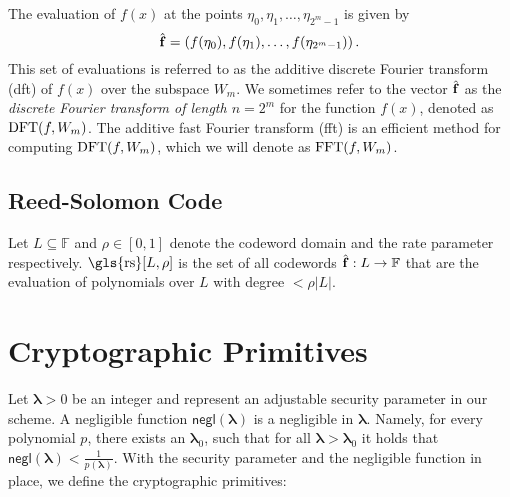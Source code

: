 \begin{definition}
	The evaluation of $f(x)$ at the points $\eta_0, \eta_1, \ldots, \eta_{2^m-1}$ is given by
	\begin{equation*}
		\hat{{\bf{f}}} = \left( f(\eta_0), f(\eta_1), \ldots, f(\eta_{2^m-1}) \right).
	\end{equation*}
	This set of evaluations is referred to as the additive discrete Fourier transform (\gls{dft}) of $f(x)$ over the subspace $W_m$. We sometimes refer to the vector $\hat{{\bf{f}}}$ as the \textit{discrete Fourier transform of length $n=2^m$} for the function $f(x)$, denoted as $\operatorname{DFT}(f, W_m)$. The additive fast Fourier transform (\gls{fft}) is an efficient method for computing $\operatorname{DFT}(f, W_m)$, which we will denote as $\operatorname{FFT}(f, W_m)$.
\end{definition}

\subsection{Reed-Solomon Code}

\begin{definition}\label{RScode} Let $L\subseteq\mathbb{F}$ and $\rho \in [0,1]$ denote the codeword domain and the rate parameter respectively. $\text{\gls{rs}}[L, \rho]$ is the set of all codewords $\hat{{\bf{f}}}:L\rightarrow\mathbb{F}$ 
	that are the evaluation of polynomials over \(L\) with degree \( < \rho|L| \).
\end{definition}

\section{Cryptographic Primitives}
\label{sec:prel_Cryptographic Primitives}

Let $\boldsymbol{\lambda} > 0$ be an integer and represent an adjustable security parameter in our scheme. A negligible function $\mathsf{negl}(\boldsymbol{\lambda})$ is a negligible in $\boldsymbol{\lambda}$. Namely, for every polynomial $p$, there exists an $\boldsymbol{\lambda}_0$, such that for   all $\boldsymbol{\lambda} > \boldsymbol{\lambda}_0$ it holds that $\mathsf{negl}(\boldsymbol{\lambda})<\frac{1}{p(\boldsymbol{\lambda})}$. With the security parameter and the negligible function in place, we define the cryptographic primitives:

